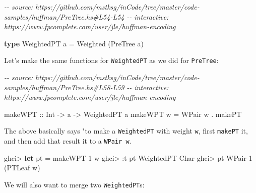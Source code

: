 \documentclass[]{article}
\newenvironment{Shaded}{}{}
\newcommand{\CharTok}[1]{\textcolor[rgb]{0.25,0.44,0.63}{#1}}
\newcommand{\CommentTok}[1]{\textcolor[rgb]{0.38,0.63,0.69}{\textit{#1}}}
\newcommand{\DataTypeTok}[1]{\textcolor[rgb]{0.56,0.13,0.00}{#1}}
\newcommand{\DecValTok}[1]{\textcolor[rgb]{0.25,0.63,0.44}{#1}}
\newcommand{\KeywordTok}[1]{\textcolor[rgb]{0.00,0.44,0.13}{\textbf{#1}}}
\newcommand{\NormalTok}[1]{#1}
\newcommand{\OperatorTok}[1]{\textcolor[rgb]{0.40,0.40,0.40}{#1}}
\newcommand{\OtherTok}[1]{\textcolor[rgb]{0.00,0.44,0.13}{#1}}
\begin{document}
\begin{Shaded}
\begin{Highlighting}[]
\CommentTok{{-}{-} source: https://github.com/mstksg/inCode/tree/master/code{-}samples/huffman/PreTree.hs\#L54{-}L54}
\CommentTok{{-}{-} interactive: https://www.fpcomplete.com/user/jle/huffman{-}encoding}

\KeywordTok{type} \DataTypeTok{WeightedPT}\NormalTok{ a }\OtherTok{=} \DataTypeTok{Weighted}\NormalTok{ (}\DataTypeTok{PreTree}\NormalTok{ a)}
\end{Highlighting}
\end{Shaded}

Let's make the same functions for \texttt{WeightedPT} as we did for
\texttt{PreTree}:

\begin{Shaded}
\begin{Highlighting}[]
\CommentTok{{-}{-} source: https://github.com/mstksg/inCode/tree/master/code{-}samples/huffman/PreTree.hs\#L58{-}L59}
\CommentTok{{-}{-} interactive: https://www.fpcomplete.com/user/jle/huffman{-}encoding}

\OtherTok{makeWPT ::} \DataTypeTok{Int} \OtherTok{{-}>}\NormalTok{ a }\OtherTok{{-}>} \DataTypeTok{WeightedPT}\NormalTok{ a}
\NormalTok{makeWPT w }\OtherTok{=} \DataTypeTok{WPair}\NormalTok{ w }\OperatorTok{.}\NormalTok{ makePT}
\end{Highlighting}
\end{Shaded}

The above basically says "to make a \texttt{WeightedPT} with weight \texttt{w},
first \texttt{makePT} it, and then add that result it to a \texttt{WPair\ w}.

\begin{Shaded}
\begin{Highlighting}[]
\NormalTok{ghci}\OperatorTok{>} \KeywordTok{let}\NormalTok{ pt }\OtherTok{=}\NormalTok{ makeWPT }\DecValTok{1} \CharTok{\textquotesingle{}w\textquotesingle{}}
\NormalTok{ghci}\OperatorTok{>} \OperatorTok{:}\NormalTok{t pt}
\DataTypeTok{WeightedPT} \DataTypeTok{Char}
\NormalTok{ghci}\OperatorTok{>}\NormalTok{ pt}
\DataTypeTok{WPair} \DecValTok{1}\NormalTok{ (}\DataTypeTok{PTLeaf} \CharTok{\textquotesingle{}w\textquotesingle{}}\NormalTok{)}
\end{Highlighting}
\end{Shaded}

We will also want to merge two \texttt{WeightedPT}s:
\end{document}
